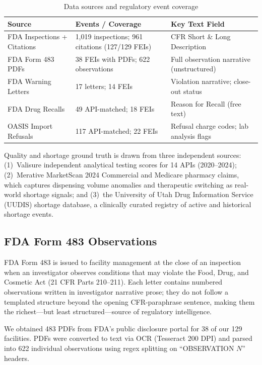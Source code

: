 \documentclass[12pt]{article}
\begin{document}
\begin{table}[h!]
\centering
\caption{Data sources and regulatory event coverage}
\label{tab:data}
\begin{tabular}{p{3.8cm} p{4.2cm} p{4.4cm}}
\toprule
\textbf{Source} & \textbf{Events / Coverage} & \textbf{Key Text Field} \\
\midrule
FDA Inspections + Citations & 1,019 inspections; 961 citations (127/129 FEIs) & CFR Short \& Long Description \\
FDA Form 483 PDFs & 38 FEIs with PDFs; 622 observations & Full observation narrative (unstructured) \\
FDA Warning Letters & 17 letters; 14 FEIs & Violation narrative; close-out status \\
FDA Drug Recalls & 49 API-matched; 18 FEIs & Reason for Recall (free text) \\
OASIS Import Refusals & 117 API-matched; 22 FEIs & Refusal charge codes; lab analysis flags \\
\bottomrule
\end{tabular}
\end{table}

Quality and shortage ground truth is drawn from three independent sources:
(1)~Valisure independent analytical testing scores for 14 APIs (2020--2024);
(2)~Merative MarketScan 2024 Commercial and Medicare pharmacy claims, which
captures dispensing volume anomalies and therapeutic switching as real-world
shortage signals; and
(3)~the University of Utah Drug Information Service (UUDIS) shortage database,
a clinically curated registry of active and historical shortage events.

\subsection{FDA Form 483 Observations}

FDA Form 483 is issued to facility management at the close of an inspection
when an investigator observes conditions that may violate the Food, Drug, and
Cosmetic Act (21 CFR Parts 210--211).
Each letter contains numbered observations written in investigator narrative
prose; they do not follow a templated structure beyond the opening
CFR-paraphrase sentence, making them the richest---but least structured---source
of regulatory intelligence.

We obtained 483 PDFs from FDA's public disclosure portal for 38 of our 129
facilities.
PDFs were converted to text via OCR (Tesseract 200 DPI) and parsed into
622 individual observations using regex splitting on ``OBSERVATION $N$'' headers.
\end{document}
